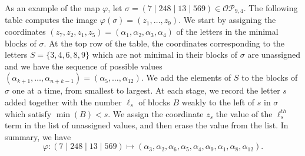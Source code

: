 \documentclass[10pt]{amsart}
\theoremstyle{definition}
\newcommand{\OP}{{\mathcal{OP}}}
\begin{document}
As an example of the map $\varphi$, let $\sigma = (7 \mid 248 \mid 13 \mid 569) \in \OP_{9,4}$.
The following table computes the image $\varphi(\sigma) = (z_1, \dots, z_9)$.
We start by assigning the coordinates $(z_7, z_2, z_1, z_5) = (\alpha_1, \alpha_2, \alpha_3, \alpha_4)$
of the letters in the minimal blocks of $\sigma$.
At the top row of the table, the coordinates corresponding to the letters $S = \{3,4,6,8,9\}$ which are not minimal
in their blocks of $\sigma$ are unassigned and we have the sequence of possible values 
$(\alpha_{k+1}, \dots, \alpha_{n+k-1}) = (\alpha_5, \dots, \alpha_{12})$.
We add the elements of $S$ to the blocks of $\sigma$ one at a time, from smallest to largest.
At each stage, we record the letter $s$ added together with the number $\ell_s$ of blocks $B$
weakly to the left of $s$ in $\sigma$ which satisfy $\min(B) < s$.
We assign the coordinate $z_s$ the value of the $\ell_s^{th}$ term in the list of unassigned values, 
and then erase the value from the list.
In summary, we have
\begin{equation*}
\varphi: ( 7   \mid 2 4 8  \mid 1 3  \mid 5 6 9) \mapsto 
(\alpha_3, \alpha_2,  \alpha_6,  \alpha_5 , \alpha_4, \alpha_9, \alpha_1,  \alpha_8, \alpha_{12}).
\end{equation*}
\end{document}
